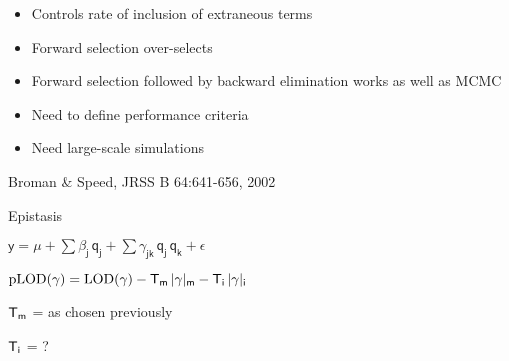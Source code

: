 \documentclass[12pt]{article}
\newcommand{\headsize}{\fontsize{35}{35} \selectfont}
\newcommand{\smallersize}{\fontsize{20}{25} \selectfont}
\newcommand{\smallestsize}{\fontsize{18}{22} \selectfont}
\newcommand{\lod}{\text{LOD}}
\newcommand{\plod}{\text{pLOD}}
\begin{document}
\hfill \begin{minipage}{10in}

\begin{itemize}
\itemsep18pt
\item Controls rate of inclusion of extraneous terms
\item Forward selection over-selects
\item {\color{myblue} Forward selection followed by backward elimination} works as well
  as {\color{myblue} MCMC}

\item {\color{mypink} Need to define performance criteria}
\item {\color{mypink} Need large-scale simulations}
\end{itemize}

\vspace{6cm}

\smallestsize \color{myblue}
\hfill Broman \& Speed, JRSS B 64:641-656, 2002

\end{minipage}


\newpage

\headsize \color{myyellow}
\hfill \begin{minipage}{5.75in}
\centering
Epistasis
\end{minipage}

\vspace{3cm} \color{mywhite} \smallersize

\hfill \begin{minipage}{10in}

\centerline{
$\mathsf{y  = \mu + \sum \beta_j \, q_j + \sum \gamma_{jk} \, q_j \,
    q_k + \epsilon}$
}

\vspace{3cm}

{\color{myyellow}
$\mathsf{ \plod(\gamma) = \lod(\gamma) -
    {\color{mypink} T_m} \, |\gamma|_m - {\color{mypink} T_i} \, |\gamma|_i }$
}


\vspace{15mm}

\hspace{3cm} $\mathsf{\color{mypink} T_m}$ = as chosen previously

\vspace{15mm}

\hspace{3cm} $\mathsf{\color{mypink} T_i}$ = ?



\end{minipage}
\end{document}
